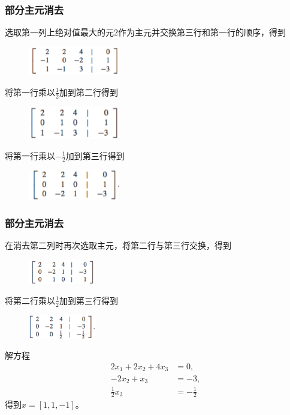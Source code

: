 \documentclass[10pt]{beamer}
\begin{document}
\begin{frame}
\frametitle{部分主元消去}
选取第一列上绝对值最大的元$2$作为主元并交换第三行和第一行的顺序，得到
\begin{figure}
\includegraphics[width=4cm]{figs/2_4_P_Pivoting-2} 
\end{figure}
将第一行乘以$\frac{1}{2}$加到第二行得到
\begin{figure}
\includegraphics[width=4cm]{figs/2_4_P_Pivoting-3} 
\end{figure}
将第一行乘以$-\frac{1}{2}$加到第三行得到
\begin{figure}
\includegraphics[width=4cm]{figs/2_4_P_Pivoting-4} 
\end{figure}
\end{frame}


\begin{frame}
\frametitle{部分主元消去}
在消去第二列时再次选取主元，将第二行与第三行交换，得到
\begin{figure}
\includegraphics[width=3cm]{figs/2_4_P_Pivoting-5} 
\end{figure}
将第二行乘以$\frac{1}{2}$加到第三行得到
\begin{figure}
\includegraphics[width=3cm]{figs/2_4_P_Pivoting-6} 
\end{figure}
解方程
\begin{align}
2x_1 + 2 x_2 + 4 x_3 &= 0, \nonumber \\
-2x_2 + x_3 &= -3, \nonumber \\
\frac{1}{2}x_3 &= -\frac{1}{2}
\end{align}
得到$x = [1,1,-1]$。
\end{frame}
\end{document}
